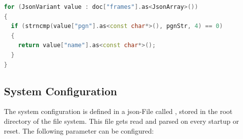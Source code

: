 \bigskip
{}
\begin{lstlisting}[backgroundcolor=\color{gray!10},  
                   basicstyle=\ttfamily,
                   columns=fullflexible,
                   breakatwhitespace=false,      
                   breaklines=true,                
                   captionpos=b,                    
                   commentstyle=\color{mygreen}, 
                   extendedchars=true,              
                   frame=single,                   
                   keepspaces=true,             
                   keywordstyle=\color{blue},      
                   language=c++,                 
                   numbers=none,                
                   numbersep=5pt,                   
                   numberstyle=\tiny\color{blue}, 
                   rulecolor=\color{mygray},        
                   showspaces=false,
                   showstringspaces=false,
                   showtabs=false,                 
                   stepnumber=5,                  
                   stringstyle=\color{mymauve},    
                   tabsize=2,                      
                   title=\lstname,
                   frame=none,
                   xleftmargin = 1cm,
                   framexleftmargin = 1em]
for (JsonVariant value : doc["frames"].as<JsonArray>())
{
  if (strncmp(value["pgn"].as<const char*>(), pgnStr, 4) == 0)
  {
    return value["name"].as<const char*>();
  }
}
\end{lstlisting}


\newpage

\subsection{System Configuration} \label{System Configuration}
The system configuration is defined in a \acrshort{json}-File called , stored in the root directory of the file system. This file gets read and parsed on every startup or reset. The following parameter can be configured:

